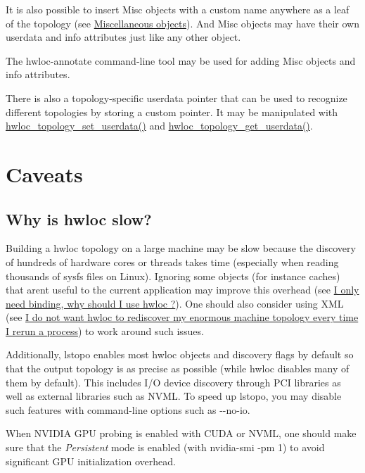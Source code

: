 It is also possible to insert Misc objects with a custom name anywhere as a leaf of the topology (see \hyperlink{a00385}{Miscellaneous objects}). And Misc objects may have their own userdata and info attributes just like any other object.

The hwloc-\/annotate command-\/line tool may be used for adding Misc objects and info attributes.

There is also a topology-\/specific userdata pointer that can be used to recognize different topologies by storing a custom pointer. It may be manipulated with {\ttfamily \hyperlink{a00193_ga2cc7b7b155cba58dda203e54f1637b9c}{hwloc\+\_\+topology\+\_\+set\+\_\+userdata()}} and {\ttfamily \hyperlink{a00193_ga91f992f8d6c4905b2d3c4f43e509c2a3}{hwloc\+\_\+topology\+\_\+get\+\_\+userdata()}}.

 \hypertarget{a00394_faq3}{}\section{Caveats}\label{a00394_faq3}
\hypertarget{a00394_faq_slow_lstopo}{}\subsection{Why is hwloc slow?}\label{a00394_faq_slow_lstopo}
Building a hwloc topology on a large machine may be slow because the discovery of hundreds of hardware cores or threads takes time (especially when reading thousands of sysfs files on Linux). Ignoring some objects (for instance caches) that aren\textquotesingle{}t useful to the current application may improve this overhead (see \hyperlink{a00394_faq_why}{I only need binding, why should I use hwloc ?}). One should also consider using X\+ML (see \hyperlink{a00394_faq_xml}{I do not want hwloc to rediscover my enormous machine topology every time I rerun a process}) to work around such issues.

Additionally, lstopo enables most hwloc objects and discovery flags by default so that the output topology is as precise as possible (while hwloc disables many of them by default). This includes I/O device discovery through P\+CI libraries as well as external libraries such as N\+V\+ML. To speed up lstopo, you may disable such features with command-\/line options such as {\ttfamily -\/-\/no-\/io}.

When N\+V\+I\+D\+IA G\+PU probing is enabled with C\+U\+DA or N\+V\+ML, one should make sure that the {\itshape Persistent} mode is enabled (with {\ttfamily nvidia-\/smi -\/pm 1}) to avoid significant G\+PU initialization overhead.

